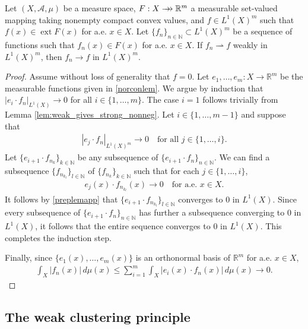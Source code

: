 \documentclass[hidelinks,onefignum,onetabnum]{siamart220329}
\newcommand{\rrightarrow}{\mathrel{\mathrlap{\rightarrow}\mkern1mu\rightarrow}}
\let\twoheadrightarrow\rrightarrow
\newcommand{\ext}{\operatorname{ext}}
\begin{document}
\begin{theorem}\label{Visintinthm}
	Let $(X,\mathcal A,\mu)$ be a measure space, $F:X\twoheadrightarrow\mathbb R^m$  a measurable set-valued mapping taking nonempty compact convex values, and $f\in {L^1(X)^m}$ such that $f(x)\in\ext F(x)$ for a.e. $x\in X$. Let  $\{f_n\}_{n\in\mathbb N}\subset {L^1(X)^m}$ be a sequence of functions such that $f_n(x)\in F(x)$ for a.e. $x\in X$. If $f_n\rightharpoonup f$  weakly in ${L^1(X)^m}$, then $f_n\to f$ in ${L^1(X)^m}$.
\end{theorem}
\begin{proof}
	Assume without loss of generality that $f=0$.
	Let $e_1,\dots, e_m:X\to\mathbb R^m$ be the measurable functions given in \cref{norconlem}.  We argue by induction that $|e_{i}\cdot f_n|_{{L^1(X)}}\to 0$ for all $i\in\{1,\dots,m\}$. The case $i=1$ follows trivially from Lemma \ref{lem:weak_gives_strong_nonneg}.
	Let $i\in\{1,\dots,m-1\}$ and suppose that 
	\begin{align*}
		|e_{j}\cdot f_n|_{{L^1(X)^m}}\to0\quad\text{for all $j\in\{1,\dots, i\}$}.
	\end{align*}
	Let $\{e_{i+1}\cdot f_{n_k}\}_{k\in\mathbb N}$ be any subsequence of $\{e_{i+1}\cdot f_n\}_{n\in\mathbb N}$. We can find a subsequence $\{f_{n_{k_l}}\}_{l\in\mathbb N}$ of $\{f_{n_k}\}_{k\in\mathbb N}$ such that  for each  $j\in\{1,\dots, i\}$,
	\begin{align*}
		e_{j}(x)\cdot f_{n_{k_l}}(x)\to 0\quad\text{for a.e. $x\in X$}.
	\end{align*}
	It follows by \cref{preplemapp} that $\{e_{i+1}\cdot f_{n_{k_l}}\}_{l\in\mathbb N}$ converges to 0 in ${L^1(X)}$.  Since every subsequence of $\{e_{i+1}\cdot f_n\}_{n\in\mathbb N}$ has further a subsequence converging to $0$ in ${L^1(X)}$, it follows that the entire sequence converges to $0$ in ${L^1(X)}$. This completes the induction step.
	
	Finally, since $\{e_1(x),\dots, e_{m}(x)\}$ is an orthonormal basis of $\mathbb R^m$ for a.e. $x\in X$, 
	\begin{align*}
		\int_{X}|f_n(x)|\, d\mu(x)\le \sum_{i=1}^m\int_{X}|e_{i}(x)\cdot f_{n}(x)|\,d\mu(x)\longrightarrow 0.
	\end{align*}
\end{proof}



	\subsection{The weak clustering principle}
\end{document}

